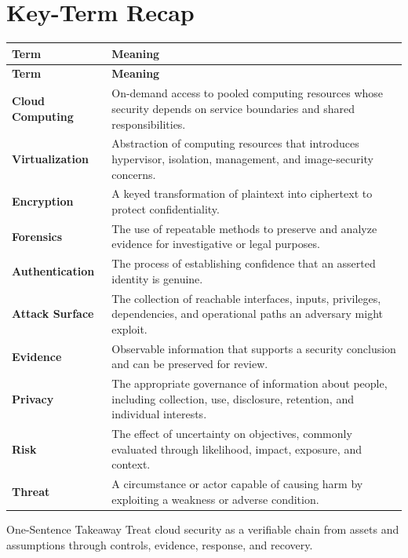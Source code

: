 \documentclass[11pt,letterpaper]{article}
\begin{document}
\section*{Key-Term Recap}
\begin{longtable}{>{\raggedright\arraybackslash}p{}>{\raggedright\arraybackslash}p{}}
\toprule\rowcolor{Navy}\color{white}\textbf{Term} & \color{white}\textbf{Meaning}\\\midrule
\endfirsthead
\toprule\rowcolor{Navy}\color{white}\textbf{Term} & \color{white}\textbf{Meaning}\\\midrule
\endhead
\textbf{Cloud Computing} & On-demand access to pooled computing resources whose security depends on service boundaries and shared responsibilities. \\\midrule
\textbf{Virtualization} & Abstraction of computing resources that introduces hypervisor, isolation, management, and image-security concerns. \\\midrule
\textbf{Encryption} & A keyed transformation of plaintext into ciphertext to protect confidentiality. \\\midrule
\textbf{Forensics} & The use of repeatable methods to preserve and analyze evidence for investigative or legal purposes. \\\midrule
\textbf{Authentication} & The process of establishing confidence that an asserted identity is genuine. \\\midrule
\textbf{Attack Surface} & The collection of reachable interfaces, inputs, privileges, dependencies, and operational paths an adversary might exploit. \\\midrule
\textbf{Evidence} & Observable information that supports a security conclusion and can be preserved for review. \\\midrule
\textbf{Privacy} & The appropriate governance of information about people, including collection, use, disclosure, retention, and individual interests. \\\midrule
\textbf{Risk} & The effect of uncertainty on objectives, commonly evaluated through likelihood, impact, exposure, and context. \\\midrule
\textbf{Threat} & A circumstance or actor capable of causing harm by exploiting a weakness or adverse condition. \\\midrule
\bottomrule
\end{longtable}
\begin{CornellExamBox}{One-Sentence Takeaway}
Treat cloud security as a verifiable chain from assets and assumptions through controls, evidence, response, and recovery.
\end{CornellExamBox}
\end{document}
